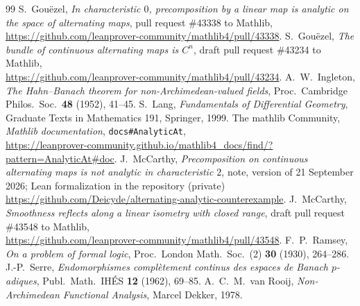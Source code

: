 \documentclass[11pt]{amsart}
\theoremstyle{definition}
\theoremstyle{remark}
\numberwithin{equation}{section}
\begin{document}
\begin{thebibliography}{99}
 S.~Gou\"ezel, \emph{In characteristic $0$, precomposition by a linear map is analytic on the space of
alternating maps}, pull request \#43338 to Mathlib,\\ {\small\url{https://github.com/leanprover-community/mathlib4/pull/43338}}.
 S.~Gou\"ezel, \emph{The bundle of continuous alternating maps is $C^n$}, draft pull request \#43234 to Mathlib,\\
{\small\url{https://github.com/leanprover-community/mathlib4/pull/43234}}.
 A.~W.~Ingleton, \emph{The Hahn--Banach theorem for non-Archimedean-valued fields}, Proc.\ Cambridge Philos.\
Soc.\ \textbf{48} (1952), 41--45.
 S.~Lang, \emph{Fundamentals of Differential Geometry}, Graduate Texts in Mathematics 191, Springer, 1999.
\bibitem{docs} The mathlib Community, \emph{Mathlib documentation}, \texttt{docs\#AnalyticAt},\\
{\small\url{https://leanprover-community.github.io/mathlib4_docs/find/?pattern=AnalyticAt#doc}}.
\bibitem{M} J.~McCarthy, \emph{Precomposition on continuous alternating maps is not analytic in characteristic $2$},
note, version of 21 September 2026; Lean formalization in the repository (private)\\
{\small\url{https://github.com/Deicyde/alternating-analytic-counterexample}}.
\bibitem{PR} J.~McCarthy, \emph{Smoothness reflects along a linear isometry with closed range}, draft pull request \#43548
to Mathlib,\\ {\small\url{https://github.com/leanprover-community/mathlib4/pull/43548}}.
\bibitem{Ra} F.~P.~Ramsey, \emph{On a problem of formal logic}, Proc.\ London Math.\ Soc.\ (2) \textbf{30} (1930), 264--286.
\bibitem{Se} J.-P.~Serre, \emph{Endomorphismes compl\`etement continus des espaces de Banach $p$\nobreakdash-adiques}, Publ.\ Math.\
IH\'ES \textbf{12} (1962), 69--85.
\bibitem{vR} A.~C.~M.~van Rooij, \emph{Non-Archimedean Functional Analysis}, Marcel Dekker, 1978.
\end{thebibliography}
\end{document}
